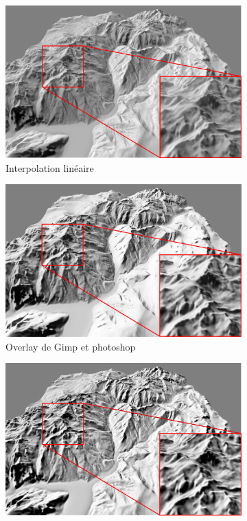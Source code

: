 \begin{figure}[!h]
\centering
 \begin{subfigure}[t]{0.32\linewidth}
 \centering
 \includegraphics[width=1.0\linewidth]{Solution/ShadeLineaire.png}
 \caption{Interpolation linéaire }
 \end{subfigure}
 \begin{subfigure}[t]{0.32\linewidth}
 \centering
 \includegraphics[width=1.0\linewidth]{Solution/ShadeOverlay.png}
  \caption{Overlay de Gimp et photoshop }
 \end{subfigure}
  \begin{subfigure}[t]{0.32\linewidth}
 \centering
 \includegraphics[width=1.0\linewidth]{Solution/ShadeWatercolor.png}

\end{subfigure}
\end{figure}
